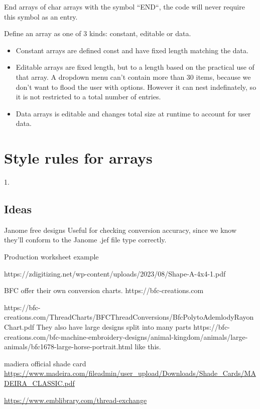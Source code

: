 \documentclass[10pt]{report}
\begin{document}
End arrays of char arrays with the symbol ``END``, the code will never require
this symbol as an entry.

Define an array as one of 3 kinds: constant, editable or data.

\begin{itemize}
\item Constant arrays are defined const and have fixed length matching the data.
\item Editable arrays are fixed length, but to a length based on the practical use
  of that array. A dropdown menu can't contain more than 30 items, because we
  don't want to flood the user with options. However it can nest indefinately,
  so it is not restricted to a total number of entries.
\item Data arrays is editable and changes total size at runtime to account for user data.
\end{itemize}

\section{Style rules for arrays}

1.






\subsection{Ideas}

Janome free designs %
Useful for checking conversion accuracy, since we know they'll conform to the
Janome .jef file type correctly.

Production worksheet example

https://zdigitizing.net/wp-content/uploads/2023/08/Shape-A-4x4-1.pdf

BFC offer their own conversion charts.
https://bfc-creations.com

https://bfc-creations.com/ThreadCharts/BFCThreadConversions/BfcPolytoAdemlodyRayonChart.pdf
They also have large designs split into many parts
https://bfc-creations.com/bfc-machine-embroidery-designs/animal-kingdom/animals/large-animals/bfc1678-large-horse-portrait.html
like this.

madiera official shade card
\url{https://www.madeira.com/fileadmin/user_upload/Downloads/Shade_Cards/MADEIRA_CLASSIC.pdf}

\url{https://www.emblibrary.com/thread-exchange}
\end{document}
